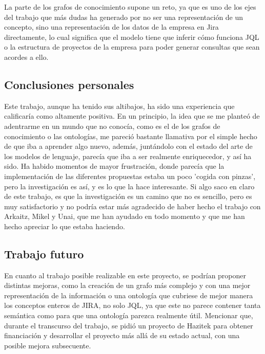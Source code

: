 La parte de los grafos de conocimiento supone un reto, ya que es uno de los ejes del trabajo que más dudas ha generado por no ser una representación de un concepto, sino una representación de los datos de la empresa en Jira directamente, lo cual significa que el modelo tiene que inferir cómo funciona JQL o la estructura de proyectos de la empresa para poder generar consultas que sean acordes a ello.


\subsection{Conclusiones personales}
Este trabajo, aunque ha tenido sus altibajos, ha sido una experiencia que calificaría como altamente positiva. En un principio, la idea que se me planteó de adentrarme en un mundo que no conocía, como es el de los grafos de conocimiento o las ontologías, me pareció bastante llamativa por el simple hecho de que iba a aprender algo nuevo, además, juntándolo con el estado del arte de los modelos de lenguaje, parecía que iba a ser realmente enriquecedor, y así ha sido. Ha habido momentos de mayor frustración, donde parecía que la implementación de las diferentes propuestas estaba un poco 'cogida con pinzas', pero la investigación es así, y es lo que la hace interesante. Si algo saco en claro de este trabajo, es que la investigación es un camino que no es sencillo, pero es muy satisfactorio y no podría estar más agradecido de haber hecho el trabajo con Arkaitz, Mikel y Unai, que me han ayudado en todo momento y que me han hecho apreciar lo que estaba haciendo.

\subsection{Trabajo futuro}
En cuanto al trabajo posible realizable en este proyecto, se podrían proponer distintas mejoras, como la creación de un grafo más complejo y con una mejor representación de la información o una ontología que cubriese de mejor manera los conceptos enteros de JIRA, no solo JQL, ya que este no parece contener tanta semántica como para que una ontología parezca realmente útil. Mencionar que, durante el transcurso del trabajo, se pidió un proyecto de Hazitek para obtener financiación y desarrollar el proyecto más allá de su estado actual, con una posible mejora subsecuente.